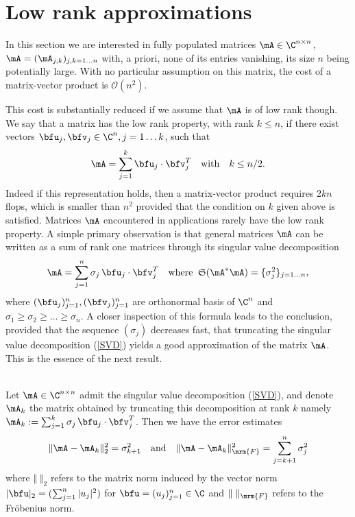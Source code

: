


\section{Low rank approximations}
\label{sec:LowRankApprox}

In this section we are interested in fully populated matrices $\mA\in \C^{n\times n}$, $\mA = (\mA_{j,k})_{j,k=1\dots n}$ with, a priori, 
none of its entries vanishing, its size $n$ being potentially large. With no particular assumption on this matrix, the cost of a 
matrix-vector product is $\mathcal{O}(n^{2})$. 

\bigskip
This cost is substantially reduced if we assume that $\mA$ is of low rank though. We say that a matrix has the low rank property, 
with rank $k\leq n$, if there exist vectors $\bfu_{j},\bfv_{j}\in \C^{n}, j=1\dots k$, such that 
$$
\mA = \sum_{j=1}^{k}\bfu_{j}\cdot\bfv_{j}^{T}\quad \textrm{with}\quad k\leq n/2.
$$ 
Indeed if this representation holds, then a matrix-vector product requires $2 k n$ flops, which is smaller than $n^{2}$ provided 
that the condition on $k$ given above is satisfied. Matrices $\mA$ encountered in applications rarely have the low rank property. 
A simple primary observation is that general matrices $\mA$ can be written as a sum of rank one matrices through its singular value
decomposition
\begin{equation}\label{SVD}
\mA = \sum_{j=1}^{n}\sigma_{j}\,\bfu_{j}\cdot\bfv_{j}^{T}\quad \textrm{where}\;\; \mathfrak{S}(\mA^{*}\mA) = \{\sigma_{j}^{2}\}_{j=1\dots n},
\end{equation}
where $(\bfu_{j})_{j=1}^{n}, (\bfv_{j})_{j=1}^{n}$ are orthonormal basis of $\C^{n}$ and $\sigma_{1}\geq \sigma_{2}\geq \dots \geq \sigma_{n}$. 
A closer inspection of this formula leads to the conclusion, provided that the sequence $(\sigma_{j})$  decreases fast, that 
truncating the singular value decomposition (\ref{SVD}) yields a good approximation of the matrix $\mA$. This is the essence of 
the next result.

\begin{proposition}\quad\\
Let $\mA\in \C^{n\times n}$ admit the singular value decomposition (\ref{SVD}), and denote $\mA_{k}$ the 
matrix obtained by truncating this decomposition at rank $k$ namely $\mA_{k}:=\sum_{j=1}^{k}\sigma_{j}\,\bfu_{j}
\cdot\bfv_{j}^{T}$. Then we have the error estimates
$$
\Vert \mA - \mA_{k}\Vert_{2}^{2} = \sigma_{k+1}^{2}
\quad\textrm{and}\quad 
\Vert \mA - \mA_{k}\Vert_{\mrm{F}}^{2} = \sum_{j=k+1}^{n}\sigma_{j}^{2}
$$
where $\Vert \;\Vert_{2}$ refers to the matrix norm induced by the vector norm $\vert \bfu\vert_{2} = (\sum_{j=1}^{n}\vert u_{j}\vert^{2})$ 
for $\bfu = (u_{j})_{j=1}^{n}\in \C$ and $\Vert \;\Vert_{\mrm{F}}$ refers to the Fr\"obenius norm.
\end{proposition}

